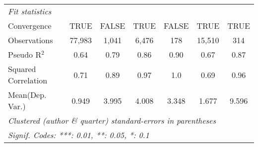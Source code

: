 \begin{tabular}{lcccccc}
   \midrule
   \emph{Fit statistics}\\
   Convergence                                                &TRUE           & FALSE         & TRUE          & FALSE     & TRUE         & TRUE\\  
   Observations                                               & 77,983        & 1,041         & 6,476         & 178       & 15,510       & 314\\  
   Pseudo R$^2$                                               & 0.64          & 0.79          & 0.86          & 0.90      & 0.67         & 0.87\\  
   Squared Correlation                                        & 0.71          & 0.89          & 0.97          & 1.0       & 0.69         & 0.96\\  
Mean(Dep. Var.) & 0.949 & 3.995 & 4.008 & 3.348 & 1.677 & 9.596 \\
   \midrule \midrule
   \multicolumn{7}{l}{\emph{Clustered (author \& quarter) standard-errors in parentheses}}\\
   \multicolumn{7}{l}{\emph{Signif. Codes: ***: 0.01, **: 0.05, *: 0.1}}\\
\end{tabular}
\par\endgroup
